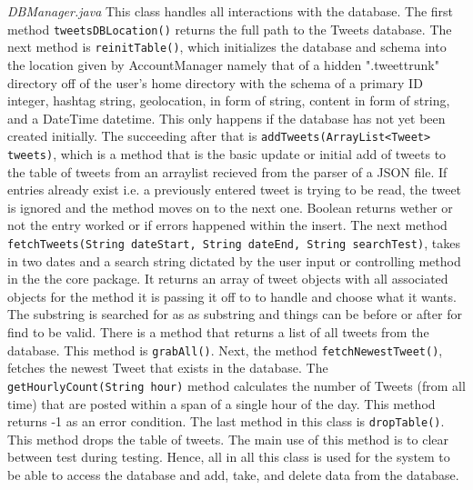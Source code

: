 \documentclass[a4paper, 12pt]{article}
\begin{document}
\begin{adjustwidth}{2em}{0pt}
\begin{adjustwidth}{2em}{0pt}
\noindent \textit{DBManager.java} \newline
This class handles all interactions with the database. The first method \newline \texttt {tweetsDBLocation()} returns the full path to the Tweets database. The next method is \texttt {reinitTable()}, which initializes the database and schema into the location given by AccountManager namely that of a hidden ".tweettrunk" directory off of the user's home directory with the schema of a primary ID integer, hashtag string, geolocation, in form of string, content in form of string, and a DateTime datetime.  This only happens if the database has not yet been created initially. The succeeding after that is \texttt {addTweets(ArrayList<Tweet> tweets)}, which is a method that   is the basic update or initial add of tweets to the table of tweets from  an arraylist recieved from the parser of a JSON file.  If entries already exist i.e. a previously entered tweet is trying to be read, the tweet is ignored and  the method moves on to the next one.  Boolean returns wether or not the entry worked or if errors happened within the insert. The next method \texttt {fetchTweets(String dateStart, String dateEnd, String searchTest)}, takes in two dates and a search string dictated by the user input or controlling method in the the core package.  It returns an array of tweet objects with all associated objects for the method it is passing it off to to handle and choose what it wants.  The substring is searched  for as as substring and things can be before or after for find to be valid. There is a method that returns a list of all tweets from the database. This method is \texttt {grabAll()}. Next, the method \texttt {fetchNewestTweet()}, fetches the newest Tweet that exists in the database. The \texttt {getHourlyCount(String hour)} method calculates the number of Tweets (from all time) that are posted within a span of a single hour of the day. This method  returns -1 as an error condition. The last method in this class is \texttt {dropTable()}. This method drops the table of tweets. The main use of this method is to clear between test during testing. Hence, all in all this class is used for the system to be able to access the database and add, take, and delete data from the database. \newline\newline


\end{adjustwidth}
\end{adjustwidth}
\end{document}
